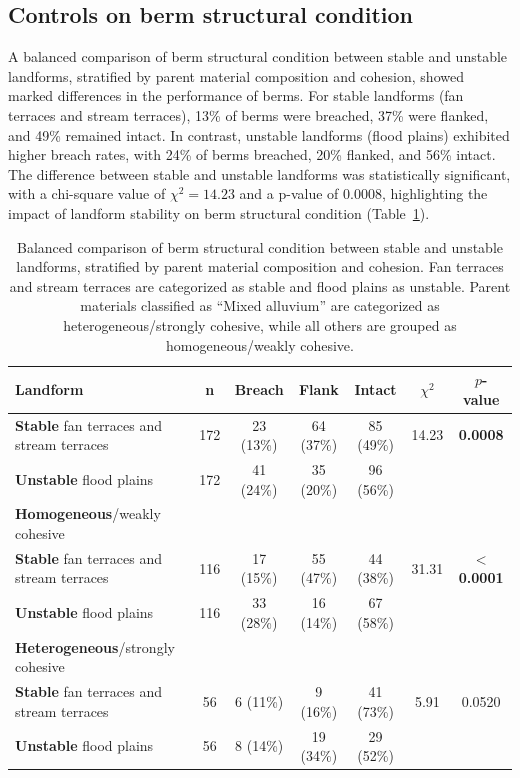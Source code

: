 \documentclass[review]{elsarticle}
\begin{document}
\subsection{Controls on berm structural condition}

A balanced comparison of berm structural condition between stable and unstable landforms, stratified by parent material composition and cohesion, showed marked differences in the performance of berms. 
For stable landforms (fan terraces and stream terraces), 13\% of berms were breached, 37\% were flanked, and 49\% remained intact. 
In contrast, unstable landforms (flood plains) exhibited higher breach rates, with 24\% of berms breached, 20\% flanked, and 56\% intact. The difference between stable and unstable landforms was statistically significant, with a chi-square value of $\chi^2 = 14.23$ and a p-value of 0.0008, highlighting the impact of landform stability on berm structural condition (Table~\ref{tab:stability_parentmat_chi}).

\begin{table}[h!]
\centering
\caption{\normalsize Balanced comparison of berm structural condition between stable and unstable landforms, stratified by parent material composition and cohesion. Fan terraces and stream terraces are categorized as stable and flood plains as unstable. Parent materials classified as ``Mixed alluvium'' are categorized as heterogeneous/strongly cohesive, while all others are grouped as homogeneous/weakly cohesive.}
\small
\begin{tabular}{|l|c|c|c|c|c|c|}
\hline
\textbf{Landform} & \textbf{n} & \textbf{Breach} & \textbf{Flank} & \textbf{Intact} & \textbf{$\chi^2$} & \textbf{$p$-value} \\
\hline
\textbf{Stable} fan terraces and stream terraces & 172 & 23 (13\%) & 64 (37\%) & 85 (49\%) & 14.23 & \textbf{0.0008} \\
\hline
\textbf{Unstable} flood plains & 172 & 41 (24\%) & 35 (20\%) & 96 (56\%) & & \\
\hline
\hline
\textbf{Homogeneous}/weakly cohesive & & & & & & \\
\hline
\textbf{Stable} fan terraces and stream terraces & 116 & 17 (15\%) & 55 (47\%) & 44 (38\%) & 31.31 & \textbf{$<$ 0.0001} \\
\hline
\textbf{Unstable} flood plains & 116 & 33 (28\%) & 16 (14\%) & 67 (58\%) & & \\
\hline
\hline
\textbf{Heterogeneous}/strongly cohesive & & & & & & \\
\hline
\textbf{Stable} fan terraces and stream terraces & 56 & 6 (11\%) & 9 (16\%) & 41 (73\%) & 5.91 & 0.0520 \\
\hline
\textbf{Unstable} flood plains & 56 & 8 (14\%) & 19 (34\%) & 29 (52\%) & & \\
\hline
\end{tabular}
\label{tab:stability_parentmat_chi}
\end{table}
\end{document}
